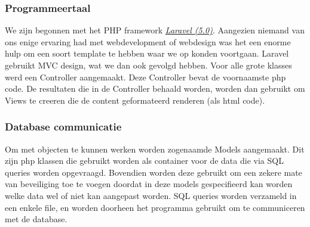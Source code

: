 \subsubsection{Programmeertaal}
We zijn begonnen met het PHP framework \href{http://laravel.com/}{\emph{Laravel (5.0)}}.
Aangezien niemand van ons enige ervaring had met webdevelopment of webdesign was het een
enorme hulp om een soort template te hebben waar we op konden voortgaan. Laravel gebruikt
MVC design, wat we dan ook gevolgd hebben. Voor alle grote klasses werd een Controller aangemaakt.
Deze Controller bevat de voornaamste php code. De resultaten die in de Controller behaald worden,
worden dan gebruikt om Views te creeren die de content geformateerd renderen (als html code).

\subsubsection{Database communicatie}
Om met objecten te kunnen werken worden zogenaamde Models aangemaakt. Dit zijn php klassen die
gebruikt worden als container voor de data die via SQL queries worden opgevraagd.
Bovendien worden deze gebruikt om een zekere mate van beveiliging toe te voegen doordat
in deze models gespecifieerd kan worden welke data wel of niet kan aangepast worden. SQL queries
worden verzameld in een enkele file, en worden doorheen het programma gebruikt om te communiceren
met de database.

\subsubsection{}


